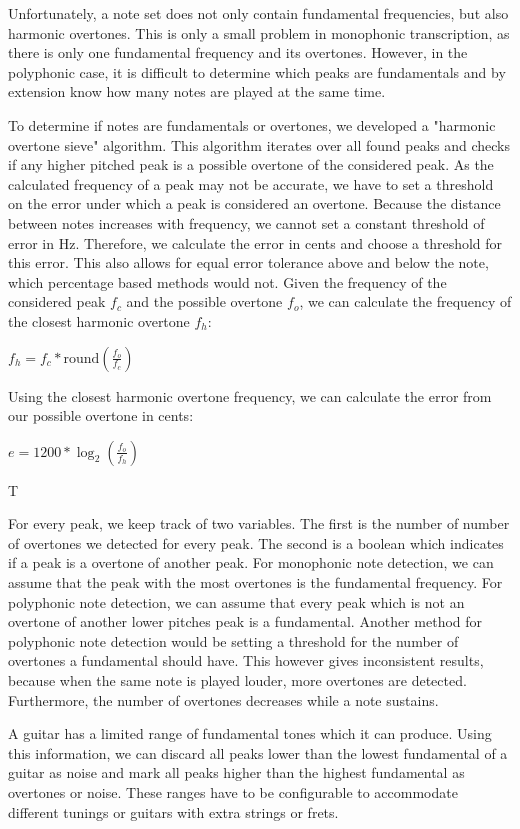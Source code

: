 \documentclass[10pt,twocolumn]{article}
\begin{document}
Unfortunately, a note set does not only contain fundamental frequencies, but also harmonic overtones. This is only a small problem in monophonic transcription, as there is only one fundamental frequency and its overtones. However, in the polyphonic case, it is difficult to determine which peaks are fundamentals and by extension know how many notes are played at the same time.

To determine if notes are fundamentals or overtones, we developed a "harmonic overtone sieve" algorithm. This algorithm iterates over all found peaks and checks if any higher pitched peak is a possible overtone of the considered peak. As the calculated frequency of a peak may not be accurate, we have to set a threshold on the error under which a peak is considered an overtone. Because the distance between notes increases with frequency, we cannot set a constant threshold of error in Hz. Therefore, we calculate the error in cents and choose a threshold for this error. This also allows for equal error tolerance above and below the note, which percentage based methods would not. Given the frequency of the considered peak $f_c$ and the possible overtone $f_o$, we can calculate the frequency of the closest harmonic overtone $f_h$:
\begin{center}
    $f_h = f_c * \text{round}(\frac{f_o}{f_c})$
\end{center}
Using the closest harmonic overtone frequency, we can calculate the error from our possible overtone in cents:
\begin{center}
    $e = 1200 * \log_2(\frac{f_o}{f_h})$
\end{center}
T

For every peak, we keep track of two variables. The first is the number of number of overtones we detected for every peak. The second is a boolean which indicates if a peak is a overtone of another peak. For monophonic note detection, we can assume that the peak with the most overtones is the fundamental frequency. For polyphonic note detection, we can assume that every peak which is not an overtone of another lower pitches peak is a fundamental. Another method for polyphonic note detection would be setting a threshold for the number of overtones a fundamental should have. This however gives inconsistent results, because when the same note is played louder, more overtones are detected. Furthermore, the number of overtones decreases while a note sustains.

A guitar has a limited range of fundamental tones which it can produce. Using this information, we can discard all peaks lower than the lowest fundamental of a guitar as noise and mark all peaks higher than the highest fundamental as overtones or noise. These ranges have to be configurable to accommodate different tunings or guitars with extra strings or frets.
\end{document}
